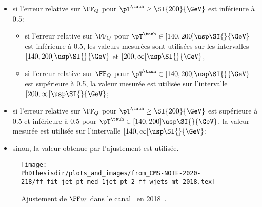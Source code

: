 \begin{itemize}
\item si l'erreur relative sur $\FF_Q$ pour $\pT^{\tauh}\geq\SI{200}{\GeV}$ est inférieure à \num{0.5}:
\begin{itemize}
\item si l'erreur relative sur $\FF_Q$ pour $\pT^{\tauh}\in[140, 200]\usp\SI{}{\GeV}$ est inférieure à \num{0.5}, les valeurs mesurées sont utilisées sur les intervalles $[140, 200]\usp\SI{}{\GeV}$ et $[200, \infty[\usp\SI{}{\GeV}$,
\item si l'erreur relative sur $\FF_Q$ pour $\pT^{\tauh}\in[140, 200]\usp\SI{}{\GeV}$ est supérieure à \num{0.5}, la valeur mesurée est utilisée sur l'intervalle $[200, \infty[\usp\SI{}{\GeV}$;
\end{itemize}
\item si l'erreur relative sur $\FF_Q$ pour $\pT^{\tauh}\geq\SI{200}{\GeV}$ est supérieure à \num{0.5}
et inférieure à \num{0.5} pour $\pT^{\tauh}\in[140, 200]\usp\SI{}{\GeV}$,
la valeur mesurée est utilisée sur l'intervalle $[140, \infty[\usp\SI{}{\GeV}$;
\item sinon, la valeur obtenue par l'ajustement est utilisée.
\end{itemize}
\begin{wrapfigure}[20]{R}{.46\textwidth}
\centering
\texttt{[image: \\PhDthesisdir/plots\_and\_images/from\_CMS-NOTE-2020-218/ff\_fit\_jet\_pt\_med\_1jet\_pt\_2\_ff\_wjets\_mt\_2018.tex]}
\caption[Ajustement de $\FF_W$ dans le canal \mu\tauh\ en 2018.]{Ajustement de $\FF_W$ dans le canal \mu\tauh\ en 2018~\cite{CMS-NOTE-2020-218}.}
\label{subfig-chapter-HTT_analysis-section-bg_estimation-FF_method-WJ}
\end{wrapfigure}
